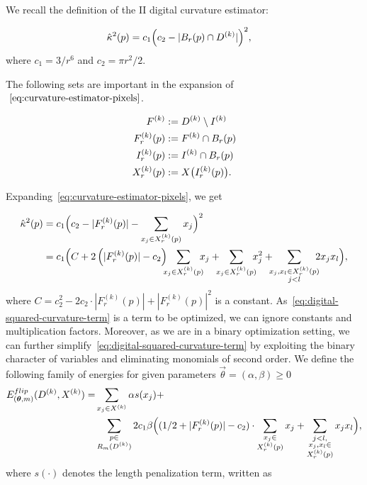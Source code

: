 We recall the definition of the II digital curvature estimator:

\begin{align}
	\hat{\kappa}^2(p) &= c_1\Big( c_2 - | B_r(p) \cap D^{(k)} | \Big)^2, 
	\label{eq:curvature-estimator-pixels}
\end{align}
where $c_1=3/r^6$ and $c_2=\pi r^2/2$. 

The following sets are important in the expansion of $~\cref{eq:curvature-estimator-pixels}$.


\begin{align*}
	F^{(k)} &:= D^{(k)} \setminus I^{(k)} \\
	F_r^{(k)}(p) &:= F^{(k)} \cap B_r(p)\\
	I_r^{(k)}(p) &:= I^{(k)} \cap B_r(p) \\
	X_r^{(k)}(p) &:= X\big( I_r^{(k)}(p) \big). \\
\end{align*}


Expanding~\cref{eq:curvature-estimator-pixels}, we get 

\begin{align}
  \hat{\kappa}^2(p) &= c_1\Big( c_2 - |F_{r}^{(k)}(p)| - \sum_{x_j \in X_r^{(k)}(p)} {x_j} \Big)^2 \nonumber \\
   &= c_1 \Big( C + 2\left( |F_{r}^{(k)}(p)| - c_2 \right) \hspace{-2mm}\sum_{x_j \in X_{r}^{(k)}(p)}\hspace{-2mm}{x_j} + \hspace{-2mm}\sum_{x_j \in X_{r}^{(k)}(p)}\hspace{-2mm}{x_j^2} + \hspace{-2mm}\sum_{ \substack{x_j,x_l \in X_{r}^{(k)}(p) \\ j<l} }\hspace{-2mm}{2x_jx_l}  \Big),
   \label{eq:digital-squared-curvature-term}
\end{align}
where $C=c_2^2 - 2c_2 \cdot |F_{r}^{(k)}(p)| + |F_{r}^{(k)}(p)|^2$ is a constant. As~\cref{eq:digital-squared-curvature-term} is a term to be optimized, we can ignore constants and multiplication factors. Moreover, as we are in a binary optimization setting, we can  further simplify~\cref{eq:digital-squared-curvature-term} by exploiting the binary character of variables and eliminating monomials of second order. We define the following family
of energies for given parameters $\vec{\theta}=(\alpha,\beta ) \geq 0$
\begin{align}
  E_{(\bm{\theta},m)}^{flip}(D^{(k)},X^{(k)}) =& \sum_{x_j \in X^{(k)}}{\alpha s(x_j)} + \nonumber \\ 
  & \sum_{ \substack{p \in \\ R_m(D^{(k)})}}{ 2c_1 \beta  \Big( { (1/2+ |F_{r}^{(k)}(p)|-c_2) \cdot \sum_{ \substack{ x_j \in \\ X_{r}^{(k)}(p)}}{x_j} } + \sum_{ \substack{j<l, \\ x_j,x_l \in \\ X_{r}^{(k)}(p) } }{x_jx_l} \Big) },
  \label{eq:energy-family}
\end{align}
where $s(\cdot)$ denotes the length penalization term, written as

